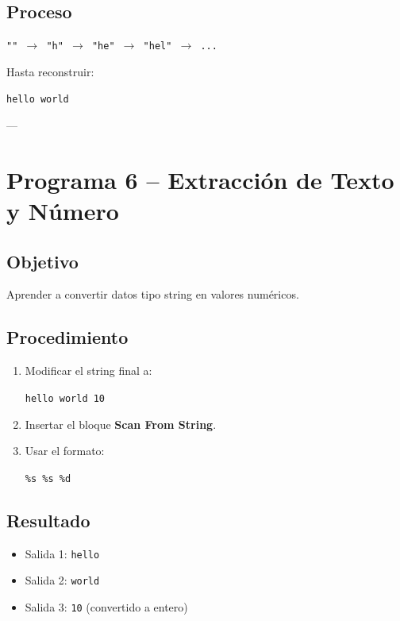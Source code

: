 \documentclass[12pt]{article}
\begin{document}
\subsection*{Proceso}

\begin{center}
\texttt{"" $\rightarrow$ "h" $\rightarrow$ "he" $\rightarrow$ "hel" $\rightarrow$ ...}
\end{center}

Hasta reconstruir:

\begin{center}
\texttt{hello world}
\end{center}

---

\section{Programa 6 – Extracción de Texto y Número}

\subsection*{Objetivo}
Aprender a convertir datos tipo string en valores numéricos.

\subsection*{Procedimiento}

\begin{enumerate}
    \item Modificar el string final a:
    \begin{center}
    \texttt{hello world 10}
    \end{center}
    \item Insertar el bloque \textbf{Scan From String}.
    \item Usar el formato:
    \begin{center}
    \texttt{\%s \%s \%d}
    \end{center}
\end{enumerate}

\subsection*{Resultado}

\begin{itemize}
    \item Salida 1: \texttt{hello}
    \item Salida 2: \texttt{world}
    \item Salida 3: \texttt{10} (convertido a entero)
\end{itemize}
\end{document}
